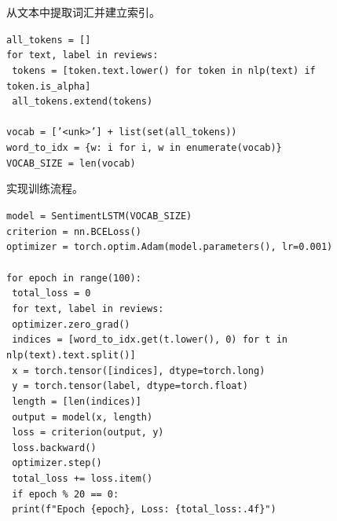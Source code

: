 \documentclass[a4paper, 12pt]{article}
\begin{document}
\begin{tcolorbox}[instancestyle, title=实例17：构建词汇表]
从文本中提取词汇并建立索引。

\texttt{all\_tokens = []} \\
\texttt{for text, label in reviews:} \\
\texttt{    tokens = [token.text.lower() for token in nlp(text) if token.is\_alpha]} \\
\texttt{    all\_tokens.extend(tokens)} \\
\texttt{} \\
\texttt{vocab = ['<unk>'] + list(set(all\_tokens))} \\
\texttt{word\_to\_idx = \{w: i for i, w in enumerate(vocab)\}} \\
\texttt{VOCAB\_SIZE = len(vocab)}
\end{tcolorbox}

\begin{tcolorbox}[instancestyle, title=实例18：模型训练循环]
实现训练流程。

\texttt{model = SentimentLSTM(VOCAB\_SIZE)} \\
\texttt{criterion = nn.BCELoss()} \\
\texttt{optimizer = torch.optim.Adam(model.parameters(), lr=0.001)} \\
\texttt{} \\
\texttt{for epoch in range(100):} \\
\texttt{    total\_loss = 0} \\
\texttt{    for text, label in reviews:} \\
\texttt{        optimizer.zero\_grad()} \\
\texttt{        indices = [word\_to\_idx.get(t.lower(), 0) for t in nlp(text).text.split()]} \\
\texttt{        x = torch.tensor([indices], dtype=torch.long)} \\
\texttt{        y = torch.tensor(label, dtype=torch.float)} \\
\texttt{        length = [len(indices)]} \\
\texttt{        output = model(x, length)} \\
\texttt{        loss = criterion(output, y)} \\
\texttt{        loss.backward()} \\
\texttt{        optimizer.step()} \\
\texttt{        total\_loss += loss.item()} \\
\texttt{    if epoch \% 20 == 0:} \\
\texttt{        print(f"Epoch \{epoch\}, Loss: \{total\_loss:.4f\}")}
\end{tcolorbox}
\end{document}
